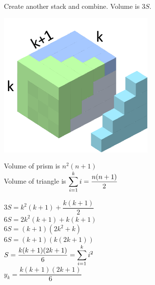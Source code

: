 \documentclass[letterpaper,fleqn,leqno]{article}
\begin{document}
\begin{enumerate}[(a)]
\begin{enumerate}
\begin{minipage}{0.4\textwidth}
			 \end{minipage}
			 Create another stack and combine. Volume is $3S$. \\
			 \begin{minipage}{0.3\textwidth}
			 	\includegraphics[scale=0.5]{detach}
			 \end{minipage}
			 \begin{minipage}{0.7\textwidth}
			 	Volume of prism is $n^2(n+1)$ \\
			 	Volume of triangle is $\displaystyle\sum\limits_{i=1}^{k}i=\dfrac{n(n+1)}{2}$ \\
			 \end{minipage}
			 $3S=k^2(k+1)+\dfrac{k(k+1)}{2}$ \\
			 $6S=2k^2(k+1)+k(k+1)$ \\
			 $6S=(k+1)(2k^2+k)$ \\
			 $6S=(k+1)(k(2k+1))$ \\
			 $S=\dfrac{k(k+1)(2k+1)}{6}=\displaystyle\sum\limits_{i=1}^{k}i^2$ \\
			 $y_k=\dfrac{k(k+1)(2k+1)}{6}$ \\
		\end{enumerate}
		\end{enumerate}
	
\end{document}
